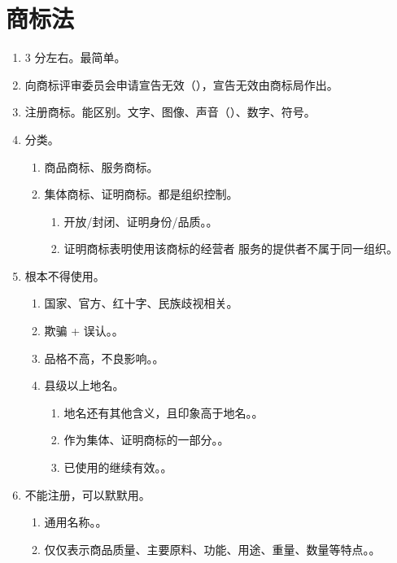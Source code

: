 \section{商标法}
\begin{enumerate}
  \item 3 分左右。最简单。
  \item 向商标评审委员会申请宣告无效（），宣告无效由商标局作出。
  \item 注册商标。能区别。文字、图像、声音（）、数字、符号。
  \item 分类。
        \begin{enumerate}
          \item 商品商标、服务商标。
          \item 集体商标、证明商标。都是组织控制。
                \begin{enumerate}
                  \item 开放/封闭、证明身份/品质。。
                  \item 证明商标表明使用该商标的经营者 \hz 服务的提供者不属于同一组织。
                \end{enumerate}
        \end{enumerate}
  \item 根本不得使用。
        \begin{enumerate}
          \item 国家、官方、红十字、民族歧视相关。
          \item 欺骗 + 误认。。
          \item 品格不高，不良影响。。
          \item 县级以上地名。
                \begin{enumerate}
                  \item 地名还有其他含义，且印象高于地名。。
                  \item 作为集体、证明商标的一部分。。
                  \item 已使用的继续有效。。
                \end{enumerate}
        \end{enumerate}
  \item 不能注册，可以默默用。
        \begin{enumerate}
          \item 通用名称。。
          \item 仅仅表示商品质量、主要原料、功能、用途、重量、数量等特点。。

\end{enumerate}
\end{enumerate}
